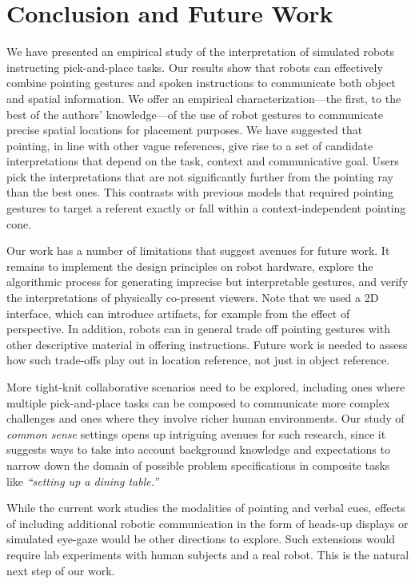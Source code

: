 \documentclass[letterpaper]{article} %
\begin{document}
\section{Conclusion and Future Work}
\label{conclusion}

We have presented an empirical study of the interpretation of simulated robots instructing pick-and-place tasks.  Our results show that robots can effectively combine pointing gestures and spoken instructions to communicate both object and spatial information. We offer an empirical characterization---the first, to the best of the authors' knowledge---of the use of robot gestures to communicate precise spatial locations for placement purposes.  We have suggested that pointing, in line with other vague references, give rise to a set of candidate interpretations that depend on the task, context and communicative goal.  Users pick the interpretations that are not significantly further from the pointing ray than the best ones.  This contrasts with previous models that required pointing gestures to target a referent exactly or fall within a context-independent pointing cone.

Our work has a number of limitations that suggest avenues for future work.   It remains to implement the design principles on robot hardware, explore the algorithmic process for generating imprecise but interpretable gestures, and verify the interpretations of physically co-present viewers.  Note that we used a 2D interface, which can introduce artifacts, for example from the effect of perspective.  In addition, robots can in general trade off pointing gestures with other descriptive material in offering instructions.  Future work is needed to assess how such trade-offs play out in location reference, not just in object reference.

More tight-knit collaborative scenarios need to be explored, including ones where multiple pick-and-place tasks can be composed to communicate more complex challenges and ones where they involve richer human environments.  Our study of  \textit{common sense} settings opens up intriguing avenues for such research, since it suggests ways to take into account background knowledge and expectations to narrow down the domain of possible problem specifications in composite tasks like \textit{``setting up a dining table.''} 

While the current work studies the modalities of pointing and verbal cues, effects of including additional robotic communication in the form of heads-up displays or simulated eye-gaze would be other directions to explore. Such extensions would require lab experiments with human subjects and a real robot.  This is the natural next step of our work. 
\end{document}
